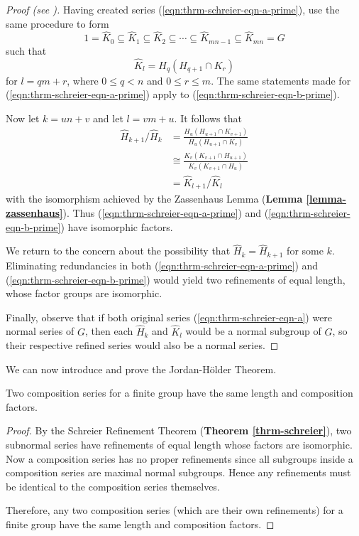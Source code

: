 \begin{proof}[Proof (see {\cite[\S 72]{clark_1984}})]
    Having created series (\ref{eqn:thrm-schreier-eqn-a-prime}), use the same procedure to form
    \begin{equation}\label{eqn:thrm-schreier-eqn-b-prime}
        1 = \hat{K}_0 \subseteq \hat{K}_1 \subseteq \hat{K}_2 \subseteq \cdots \subseteq \hat{K}_{mn - 1} \subseteq \hat{K}_{mn} = G
        \tag{B'}
    \end{equation}
    such that
    \[
        \hat{K}_l = H_q(H_{q+1}\cap K_r)
    \]
    for $l = qm + r$, where $0 \leq q < n$ and $0 \leq r \leq m$. The same statements made for (\ref{eqn:thrm-schreier-eqn-a-prime}) apply to (\ref{eqn:thrm-schreier-eqn-b-prime}).
    
    Now let $k = un + v$ and let $l = vm + u$. It follows that
    \begin{align*}
        \hat{H}_{k+1}/\hat{H}_k &= \frac{H_u(H_{u+1}\cap K_{v+1})}{H_u(H_{u+1}\cap K_v)}\\
        &\cong \frac{K_v(K_{v+1}\cap H_{u+1})}{K_v(K_{v+1}\cap H_u)}\\
        &= \hat{K}_{l+1}/\hat{K}_l
    \end{align*}
    with the isomorphism achieved by the Zassenhaus Lemma (\textbf{Lemma \ref{lemma-zassenhaus}}). Thus (\ref{eqn:thrm-schreier-eqn-a-prime}) and (\ref{eqn:thrm-schreier-eqn-b-prime}) have isomorphic factors.
    
    We return to the concern about the possibility that $\hat{H}_k = \hat{H}_{k+1}$ for some $k$. Eliminating redundancies in both (\ref{eqn:thrm-schreier-eqn-a-prime}) and (\ref{eqn:thrm-schreier-eqn-b-prime}) would yield two refinements of equal length, whose factor groups are isomorphic.
    
    Finally, observe that if both original series (\ref{eqn:thrm-schreier-eqn-a}) were normal series of $G$, then each $\hat{H}_k$ and $\hat{K}_l$ would be a normal subgroup of $G$, so their respective refined series would also be a normal series.
\end{proof}

We can now introduce and prove the Jordan-H\"older Theorem.
\begin{theorem}\label{thrm-jordan-holder}
    Two composition series for a finite group have the same length and composition factors.
\end{theorem}
\begin{proof}
    By the Schreier Refinement Theorem (\textbf{Theorem \ref{thrm-schreier}}), two subnormal series have refinements of equal length whose factors are isomorphic. Now a composition series has no proper refinements since all subgroups inside a composition series are maximal normal subgroups. Hence any refinements must be identical to the composition series themselves.
    
    Therefore, any two composition series (which are their own refinements) for a finite group have the same length and composition factors.
\end{proof}

